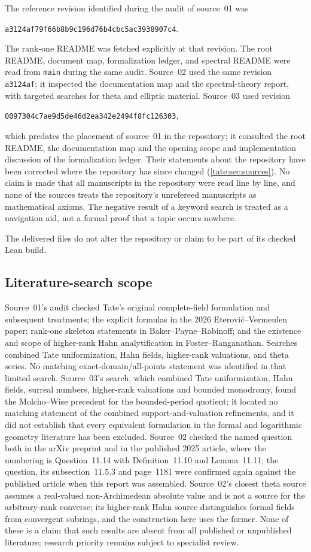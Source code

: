 \documentclass[11pt,letterpaper]{article}
\theoremstyle{definition}
\newcommand{\sha}{\texttt{a3124af79f66b8b9c196d76b4cbc5ac3938907c4}}
\newcommand{\shaN}{\texttt{0097304c7ae9d5de46d2ea342e2494f8fc126303}}
\begin{document}
The reference revision identified during the audit of source~01 was
\begin{center}\small\sha.\end{center}
The rank-one README was fetched explicitly at that revision. The root
README, document map, formalization ledger, and spectral README were
read from \texttt{main} during the same audit. Source~02 used the same
revision \texttt{a3124af}; it inspected the documentation map and the spectral-theory
report, with targeted searches for theta and elliptic material. Source~03
used revision
\begin{center}\small\shaN,\end{center}
which predates the placement of source~01 in the repository; it consulted
the root README, the documentation map and the opening scope and
implementation discussion of the formalization ledger. Their statements
about the repository have been corrected where the repository has since
changed (\cref{tate:sec:sources}). No claim is made that all manuscripts in
the repository were read line by line, and none of the sources treats the
repository's unrefereed manuscripts as mathematical axioms. The negative
result of a keyword search is treated as a navigation aid, not a formal
proof that a topic occurs nowhere.

The delivered files do not alter the repository or claim to be part of
its checked Lean build.

\subsection{Literature-search scope}

Source~01's audit checked Tate's original complete-field formulation and
subsequent treatments; the explicit formulas in the 2026
Eterovi\'c--Vermeulen paper; rank-one skeleton statements in
Baker--Payne--Rabinoff; and the existence and scope of higher-rank Hahn
analytification in Foster--Ranganathan. Searches combined Tate
uniformization, Hahn fields, higher-rank valuations, and theta series.
No matching exact-domain/all-points statement was identified in that
limited search. Source~03's search, which combined Tate uniformization, Hahn
fields, surreal numbers, higher-rank valuations and bounded monodromy,
found the Molcho--Wise precedent for the bounded-period quotient; it located
no matching statement of the combined support-and-valuation refinements,
and it did not establish that every equivalent formulation in the formal and
logarithmic geometry literature has been excluded. Source~02 checked the
named question both in the arXiv preprint and in the published 2025 article,
where the numbering is Question~11.14 with Definition~11.10 and
Lemma~11.11; the question, its subsection~11.5.3 and page~1181 were
confirmed again against the published article when this report was
assembled. Source~02's closest theta source assumes a real-valued
non-Archimedean absolute value and is not a source for the arbitrary-rank
converse; its higher-rank Hahn source distinguishes formal fields from
convergent subrings, and the construction here uses the former. None of
these is a claim that such results are absent from all published or
unpublished literature; research priority remains subject to specialist
review.
\end{document}

